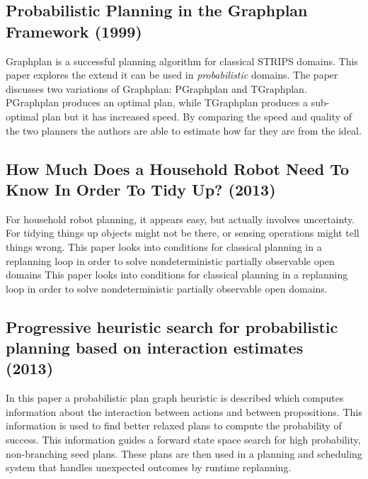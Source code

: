 \documentclass[runningheads,a4paper]{llncs}
\begin{document}
\subsection{Probabilistic Planning in the Graphplan Framework (1999)~\cite{Blum99probabilisticplanning}}
Graphplan is a successful planning algorithm for classical STRIPS domains. This
paper explores the extend it can be used in \emph{probabilistic} domains. The
paper discusses two variations of Graphplan: PGraphplan and TGraphplan.
PGraphplan produces an optimal plan, while TGraphplan produces a sub-optimal
plan but it has increased speed. By comparing the speed and quality of the
two planners the authors are able to estimate how far they are from the ideal.


\subsection{How Much Does a Household Robot Need To Know In Order To Tidy Up? (2013)~\cite{nebel2013much}}

For household robot planning, it appears easy, but actually involves
uncertainty. For tidying things up objects might not be there, or sensing
operations might tell things wrong. This paper looks into conditions for
classical planning in a replanning loop in order to solve nondeterministic
partially observable open domains This paper looks into conditions for
classical planning in a replanning loop in order to solve nondeterministic
partially observable open domains.

\subsection{Progressive heuristic search for probabilistic planning based on interaction estimates (2013)~\cite{martin2013progressive}}

In this paper a probabilistic plan graph heuristic is described which computes
information about the interaction between actions and between propositions.
This information is used to find better relaxed plans to compute the
probability of success. This information guides a forward state space search
for high probability, non-branching seed plans. These plans are then used in
a planning and scheduling system that handles unexpected outcomes by runtime
replanning.
\end{document}

